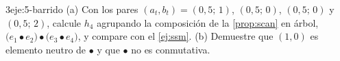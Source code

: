 \begin{ejercicio}{3}{eje:5-barrido}
(a) Con los pares $(a_t,b_t)=(0{,}5;\,1)$, $(0{,}5;\,0)$, $(0{,}5;\,0)$ y $(0{,}5;\,2)$, calcule $h_4$ agrupando la composición de la \cref{prop:scan} en árbol, $\bigl(e_1\bullet e_2\bigr)\bullet\bigl(e_3\bullet e_4\bigr)$, y compare con el \cref{ej:ssm}. (b) Demuestre que $(1,0)$ es elemento neutro de $\bullet$ y que $\bullet$ no es conmutativa.
\end{ejercicio}
